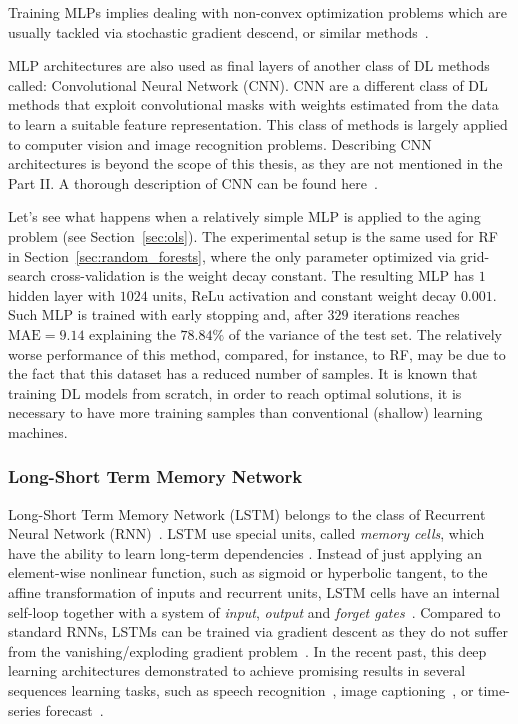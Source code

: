 	    Training MLPs implies dealing with non-convex optimization problems which are usually tackled via stochastic gradient descend, or similar methods~\cite{ruder2016overview, sra2012optimization}.

		MLP architectures are also used as final layers of another class of DL methods called: Convolutional Neural Network (\ac{CNN}).
		CNN are a different class of DL methods that exploit convolutional masks with weights estimated from the data to learn a suitable feature representation. This class of methods is largely applied to computer vision and image recognition problems.
		Describing CNN architectures is beyond the scope of this thesis, as they are not mentioned in the Part II. A thorough description of CNN can be found here~\cite{chollet2018deep, goodfellow2016deep}.

		Let's see what happens when a relatively simple MLP is applied to the aging problem (see Section~\ref{sec:ols}). The experimental setup is the same used for RF in Section~\ref{sec:random_forests}, where the only parameter optimized via grid-search cross-validation is the weight decay constant.
		The resulting MLP has $1$ hidden layer with $1024$ units, ReLu activation and constant weight decay $0.001$.
		Such MLP is trained with early stopping and, after $329$ iterations reaches $\text{MAE} = 9.14$ explaining the $78.84\%$ of the variance of the test set.
		The relatively worse performance of this method, compared, for instance, to RF, may be due to the fact that this dataset has a reduced number of samples. It is known that training DL models from scratch, in order to reach optimal solutions, it is necessary to have more training samples than conventional (shallow) learning machines.
		
		\subsubsection{Long-Short Term Memory Network} \label{sec:lstm}
		Long-Short Term Memory Network (LSTM) belongs to the class of Recurrent Neural Network (\ac{RNN})~\cite{goodfellow2016deep}.
		LSTM use special units, called {\sl memory cells}, which have the ability to learn long-term dependencies \cite{lecun2015deep}. 
		Instead of just applying an element-wise nonlinear function, such as sigmoid or hyperbolic tangent, to the affine transformation of inputs and recurrent units,
		LSTM cells have an internal self-loop together with a system of {\sl input}, {\sl output} and {\sl forget gates}~\cite{goodfellow2016deep}.
		Compared to standard RNNs, LSTMs can be trained via gradient descent as they do not suffer from the vanishing/exploding gradient problem~\cite{bengio1994learning}.
		In the recent past, this deep learning architectures demonstrated to achieve promising results in several sequences learning tasks, such as speech recognition~\cite{graves2005framewise}, image captioning~\cite{vinyals2015show}, or time-series forecast~\cite{schmidhuber2005evolino}. 
		
